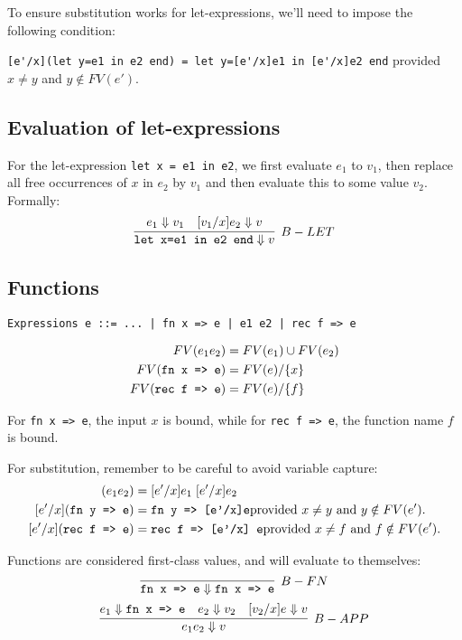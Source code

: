 \documentclass[11pt]{article}
\begin{document}
To ensure substitution works for let-expressions, we'll need to impose the following condition:

\verb~[e'/x](let y=e1 in e2 end) = let y=[e'/x]e1 in [e'/x]e2 end~ provided $x \neq y$ and $y \notin FV(e')$.

\subsection{Evaluation of let-expressions}

For the let-expression \verb~let x = e1 in e2~, we first evaluate $e_1$ to $v_1$, then replace all free occurrences of $x$ in $e_2$ by $v_1$ and then evaluate this to some value $v_2$. Formally:
\[
    \infer[B-LET]{\verb~let x=e1 in e2 end~ \Downarrow v}{
        e_1 \Downarrow v_1
        &
        [v_1 / x] e_2 \Downarrow v
    }
\]

\subsection{Functions}
\begin{verbatim}
Expressions e ::= ... | fn x => e | e1 e2 | rec f => e
\end{verbatim}
\begin{align*}
    FV(e_1 e_2) &= FV(e_1) \cup FV(e_2) \\
    FV(\verb~fn x => e~) &= FV(e) / \{x\} \\
    FV(\verb~rec f => e~) &= FV(e) / \{f\}
\end{align*}

For \verb~fn x => e~, the input $x$ is bound, while for \verb~rec f => e~, the function name $f$ is bound.

For substitution, remember to be careful to avoid variable capture:
\begin{align*}
    [e'/x] (e_1 e_2) &= [e'/x]e_1 \; [e'/x]e_2 \\
    [e'/x] (\verb~fn y => e~) &= \verb~fn y => [e'/x]e~ \textnormal{provided $x \neq y$ and $y \notin FV(e')$.} \\
    [e'/x] (\verb~rec f => e~) &= \verb~rec f => [e'/x] e~ \textnormal{provided $x \neq f$ and $f \notin FV(e')$.}
\end{align*}

Functions are considered first-class values, and will evaluate to themselves:
\[
    \infer[B-FN]{\verb~fn x => e~ \Downarrow \verb~fn x => e~}{}
\]
\[
    \infer[B-APP]{e_1 e_2 \Downarrow v}{
        e_1 \Downarrow \verb~fn x => e~
        &
        e_2 \Downarrow v_2
        &
        [v_2 / x] e \Downarrow v
     }
\]
\end{document}
